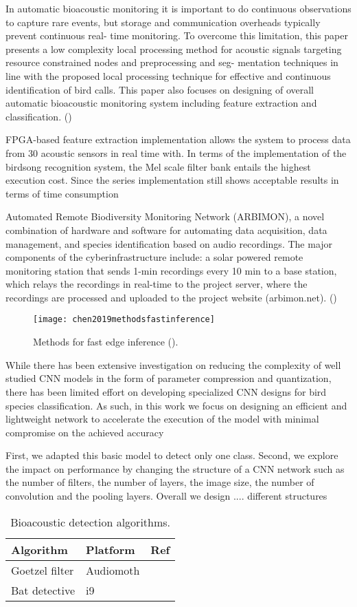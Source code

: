 In automatic bioacoustic monitoring it is important to do continuous observations to capture rare events, but storage and communication overheads typically prevent continuous real- time monitoring. To overcome this limitation, this paper presents a low complexity local processing method for acoustic signals targeting resource constrained nodes and preprocessing and seg- mentation techniques in line with the proposed local processing technique for effective and continuous identification of bird calls. This paper also focuses on designing of overall automatic bioacoustic monitoring system including feature extraction and classification.
(\cite{Weerasena2019})

FPGA-based feature extraction implementation allows the system to process data from 30 acoustic sensors in real time with.
In terms of the implementation of the birdsong recognition system, the Mel scale filter bank entails the highest execution cost. Since the series implementation still shows acceptable results in terms of time consumption %

Automated Remote Biodiversity Monitoring Network (ARBIMON), a novel combination of hardware and software for automating data acquisition, data management, and species identification based on audio recordings. The major components of the cyberinfrastructure include: a solar powered remote monitoring station that sends 1-min recordings every 10 min to a base station, which relays the recordings in real-time to the project server, where the recordings are processed and uploaded to the project website (arbimon.net). (\cite{Aide2013})


\begin{figure}[ht]
\centering
\texttt{[image: chen2019methodsfastinference]}
\caption{Methods for fast edge inference (\cite{Chen2019}).}
\end{figure}

While there has been extensive investigation on reducing the complexity of well studied CNN models in the form of parameter compression and quantization, there has been limited effort on developing specialized CNN designs for bird species classification. 
As such, in this work we focus on designing an efficient and lightweight network to accelerate the execution of the model with minimal compromise on the achieved accuracy

First, we adapted this basic model to detect only one class. Second, we explore the impact on performance by changing the structure of a CNN network such as the number of filters, the number of layers, the image size, the number of convolution and the pooling layers. Overall we design .... different structures



\begin{table}
\small
\centering
\caption{Bioacoustic detection algorithms.}
\label{biodetect}
\begin{tabular}{lll}
\toprule
Algorithm & Platform & Ref \\
\midrule
Goetzel filter & Audiomoth & \cite{Prince2019} \\
Bat detective & i9 & \cite{MacAodha2018} \\
\bottomrule
\end{tabular}
\end{table}

